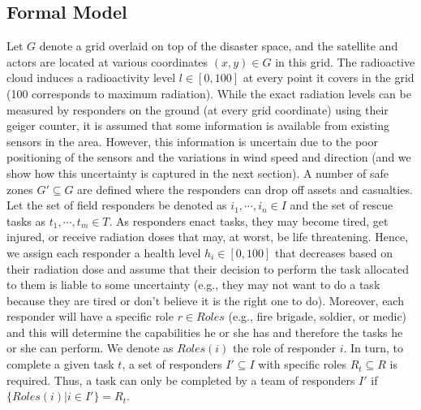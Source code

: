 \subsection{Formal Model}
\noindent Let $G$ denote a grid overlaid on top of the disaster space, and the satellite and actors are located at various coordinates $(x,y) \in G$ in this grid. The radioactive cloud induces a radioactivity level  $l \in [0,100]$ at every point it covers in the grid (100 corresponds to maximum radiation). While the exact radiation levels can be measured by responders on the ground (at every grid coordinate) using their geiger counter, it is assumed that some information is available  from existing sensors  in the area. However, this information is uncertain due to the poor positioning of the sensors and the variations in wind speed and direction (and we show how this uncertainty is captured in the next section). A number of safe zones $G' \subseteq G$ are defined where the responders can drop off assets and casualties. Let the set of field responders be denoted as $i_1, \cdots, i_n \in I$ and the set of rescue tasks as  $t_1,\cdots, t_m\in T$.  As responders enact tasks, they may become tired, get injured, or receive radiation doses that may, at worst, be life threatening. Hence, we assign each responder  a health level $h_i\in [0,100]$ that decreases based on their radiation dose and assume that their decision to perform the task allocated to them is liable to some uncertainty (e.g., they may not want to do a task because they are tired or don't believe it is the right one to do). Moreover, each responder will have  a specific role  $r \in Roles$ (e.g., fire brigade, soldier, or medic) and this will determine the capabilities he or she has and therefore the tasks he or she can perform. We denote as $Roles(i)$ the role of responder $i$. In turn, to complete a given task $t$,  a set of responders $I' \subseteq I$ with specific roles $R_t \subseteq R$ is required. Thus, a task can only be completed by a team of responders $I'$ if $\{Roles(i) | i \in I'\} = R_t$. 


